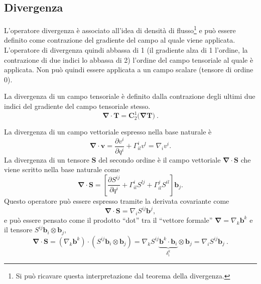 \subsection{Divergenza}
L'operatore divergenza è associato all'idea di densità di flusso\footnote{Si può ricavare questa interpretazione dal teorema della divergenza.} e può essere definito come contrazione del gradiente del campo al quale viene applicata. L'operatore di divergenza quindi abbassa di 1 (il gradiente alza di 1 l'ordine, la contrazione di due indici lo abbassa di 2) l'ordine del campo tensoriale al quale è applicata. Non può quindi essere applicata a un campo scalare (tensore di ordine 0).
\begin{operator}[Divergenza]
 La divergenza di un campo tensoriale è definito dalla contrazione degli ultimi due indici del gradiente del campo tensoriale stesso.
\begin{equation}\label{eqn:div:def}
 \bm{\nabla} \cdot \bm{T} = \bm{C}^{1}_{2} \big( \bm{\nabla} \bm{T} \big)\  .
\end{equation}
\end{operator}
La divergenza di un campo vettoriale espresso nella base naturale è
\begin{equation}\label{eqn:div:vector}
 \bm{\nabla} \cdot\bm{v} = \dfrac{\partial v^{i}}{\partial q^i} + \Gamma_{il}^i v^{l} = \nabla_i v^{i} .
\end{equation}
 La divergenza di un tensore $\bm{S}$ del secondo ordine è il campo vettoriale $\bm{\nabla} \cdot \bm{S}$ che viene scritto nella base naturale come
 \begin{equation}\label{eqn:div:tensor2}
  \bm{\nabla} \cdot \bm{S} = \left[ \dfrac{\partial S^{ij}}{\partial q^i} + \Gamma_{il}^i S^{lj} + \Gamma_{il}^j S^{il} \right] \bm{b}_j .
 \end{equation}
%
Questo operatore può essere espresso tramite la derivata covariante come
\begin{equation}
 \bm{\nabla} \cdot \bm{S} = \nabla_i S^{ij} \bm{b}^j ,
\end{equation}
e può essere pensato come il prodotto ``dot'' tra il ``vettore formale'' $\bm{\nabla} = \nabla_k \bm{b}^k$ e il tensore $S^{ij} \bm{b}_i \otimes \bm{b}_j$,
\begin{equation}
      \bm{\nabla} \cdot \bm{S} = (\nabla_k \bm{b}^k) \cdot ( S^{ij} \bm{b}_i \otimes \bm{b}_j ) = \nabla_k S^{ij} \underbrace{\bm{b}^k \cdot \bm{b}_i}_{\delta^k_i} \otimes \bm{b}_j  = 
     \nabla_i S^{ij} \bm{b}_j \ . 
\end{equation}
%

